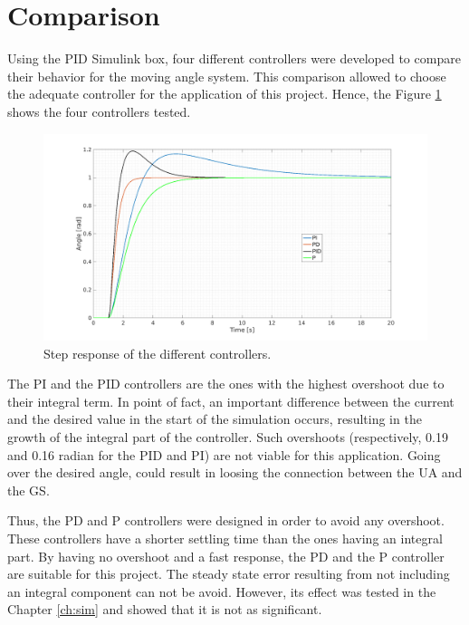\section{Comparison}
Using the PID Simulink box, four different controllers were developed to compare their behavior for the moving angle system. This comparison allowed to choose the adequate controller for the application of this project. Hence, the Figure \ref{fig:comp_pid} shows the four controllers tested.

\begin{figure}[H]
\centerline{
\includegraphics[scale=0.35]{figures/full_comp.png}}
\caption{Step response of the different controllers.}
\label{fig:comp_pid}
\end{figure}

The PI and the PID controllers are the ones with the highest overshoot due to their integral term. In point of fact, an important difference between the current and the desired value in the start of the simulation occurs, resulting in the growth of the integral part of the controller. 
Such overshoots (respectively, 0.19 and 0.16 radian for the PID and PI) are not viable for this application. Going over the desired angle, could result in loosing the connection between the UA and the GS.

Thus, the PD and P controllers were designed in order to avoid any overshoot. These controllers have a shorter settling time than the ones having an integral part. By having no overshoot and a fast response, the PD and the P controller are suitable for this project. The steady state error resulting from not including an integral component can not be avoid. However, its effect was tested in the Chapter \ref{ch:sim} and showed that it is not as significant.

\vspace{5mm}

